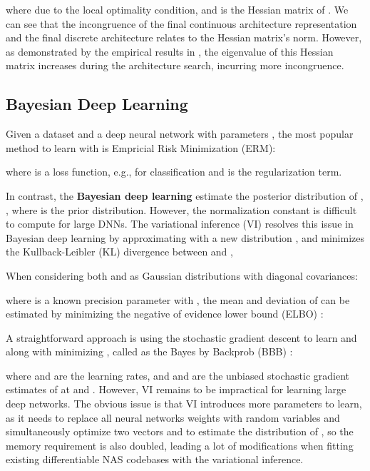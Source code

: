 \documentclass[10pt,twocolumn,letterpaper]{article}
\begin{document}
where  due to the local optimality condition, and  is the Hessian matrix of . We can see that the incongruence of the final continuous architecture representation and the final discrete architecture relates to the Hessian matrix's norm. However, as demonstrated by the empirical results in \cite{zela2019understanding}, the eigenvalue of this Hessian matrix increases during the architecture search, incurring more incongruence. 

\subsection{Bayesian Deep Learning}
\label{sec2.2}


Given a dataset  and a deep neural network with parameters , the most popular method to learn  with  is Empricial Risk Minimization (ERM):

where  is a loss function, e.g.,  for classification and  is the regularization term.

In contrast, the \textbf{Bayesian deep learning} estimate the posterior distribution of , , where  is the prior distribution. However, the normalization constant  is difficult to compute for large DNNs. The variational inference (VI)  \cite{graves2011practical} resolves this issue in Bayesian deep learning by approximating  with a new distribution , and minimizes the Kullback-Leibler (KL) divergence between  and ,

When considering both  and  as Gaussian distributions with diagonal covariances:

where  is a known precision parameter with , the mean  and deviation  of  can be estimated by minimizing the negative of evidence lower bound (ELBO) \cite{blei2017variational}:


A straightforward approach is using the stochastic gradient descent to learn  and  along with minimizing , called as the Bayes by Backprob (BBB) \cite{blundell2015weight}:

where  and  are the learning rates, and  and  are the unbiased stochastic gradient estimates of  at  and . However, VI remains to be impractical for learning large deep networks. The obvious issue is that VI introduces more parameters to learn, as it needs to replace all neural networks weights with random variables and simultaneously optimize two vectors  and  to estimate the distribution of , so the memory requirement is also doubled, leading a lot of modifications when fitting existing differentiable NAS codebases with the variational inference.
\end{document}
